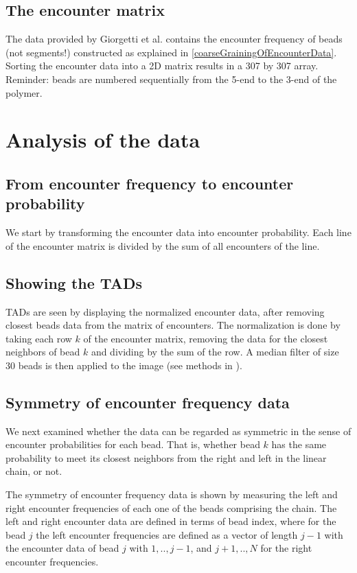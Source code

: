 \documentclass[12pt]{paper}
\begin{document}
\subsection{The encounter matrix}
The data provided by Giorgetti et al.\cite{giorgetti2014predictive} contains the encounter frequency of beads (not segments!) constructed as explained in \ref{coarseGrainingOfEncounterData}. Sorting the encounter data into a 2D matrix results in a 307 by 307 array. Reminder: beads are numbered sequentially from the 5-end to the 3-end of the polymer.

\section{Analysis of the data}

\subsection{From encounter frequency to encounter probability}
We start by transforming the encounter data into encounter probability. Each line of the encounter matrix is divided by the sum of all encounters of the line.

\subsection{Showing the TADs}
TADs are seen by displaying the normalized encounter data, after removing closest beads data from the matrix of encounters. 
The normalization is done by taking each row $k$ of the encounter matrix, removing the data for the closest neighbors of bead $k$ and dividing by the sum of the row. A median filter of size 30 beads is then applied to the image (see methods in \cite{nora2012spatial}). 
 
\subsection{Symmetry of encounter frequency data}
We next examined whether the data can be regarded as symmetric in the sense of encounter probabilities for each bead. That is, whether bead $k$ has the same probability to meet its closest neighbors from the right and left in the linear chain, or not.  

The symmetry of encounter frequency data is shown by measuring the left and right encounter frequencies of each one of the beads comprising the chain.
The left and right encounter data are defined in terms of bead index, where for the bead $j$ the left encounter frequencies are defined as a vector of length $j-1$ with the encounter data of bead $j$ with $1,..,j-1$, and $j+1,..,N$ for the right encounter frequencies. 
\end{document}
